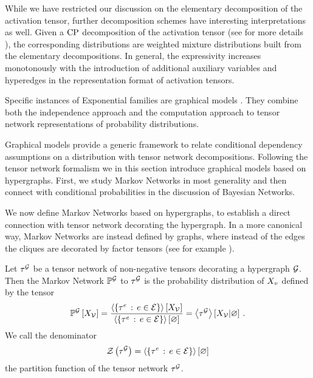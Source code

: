 While we have restricted our discussion on the elementary decomposition of the activation tensor, further decomposition schemes have interesting interpretations as well.
Given a $\mathrm{CP}$ decomposition of the activation tensor (see for more details ), the corresponding distributions are weighted mixture distributions built from the elementary decompositions.
In general, the expressivity increases monotonously with the introduction of additional auxiliary variables and hyperedges in the representation format of activation tensors.

\label{sec:graphicalModels}

Specific instances of Exponential families are graphical models \cite{wainwright_graphical_2008, murphy_probabilistic_2022}.
They combine both the independence approach and the computation approach to tensor network representations of probability distributions.

Graphical models provide a generic framework to relate conditional dependency assumptions on a distribution with tensor network decompositions.
Following the tensor network formalism we in this section introduce graphical models based on hypergraphs.
First, we study Markov Networks in most generality and then connect with conditional probabilities in the discussion of Bayesian Networks.


We now define Markov Networks based on hypergraphs, to establish a direct connection with tensor network decorating the hypergraph.
In a more canonical way, Markov Networks are instead defined by graphs, where instead of the edges the cliques are decorated by factor tensors (see for example \cite{koller_probabilistic_2009}).

\begin{definition}
    \label{def:markovNetwork}
    Let $\tau^{\mathcal{G}}$ be a tensor network of non-negative tensors decorating a hypergraph $\mathcal{G}$.
    Then the Markov Network $\mathbb{P}^{\mathcal{G}}$ to $\tau^{\mathcal{G}}$ is the probability distribution of $X_{v}$ defined by the tensor
    \begin{align*}
        \mathbb{P}^{\mathcal{G}}\left[X_{\mathcal{V}}\right] = \frac{
            \left\langle \{\tau^{e} \,:\, e\in\mathcal{E}\}\right\rangle \left[ X_{\mathcal{V}} \right]
        }{
            \left\langle \{\tau^{e} \,:\, e\in\mathcal{E}\}\right\rangle \left[ \varnothing \right]
        } = \left\langle \tau^{\mathcal{G}}\right\rangle \left[ X_{\mathcal{V}} | \varnothing \right] \, .
    \end{align*}
    We call the denominator
    \begin{align*}
        \mathcal{Z}\left(\tau^{\mathcal{G}}\right) = \left\langle \{\tau^{e} \,:\, e\in\mathcal{E}\}\right\rangle \left[ \varnothing \right]
    \end{align*}
    the partition function of the tensor network $\tau^{\mathcal{G}}$.
\end{definition}

